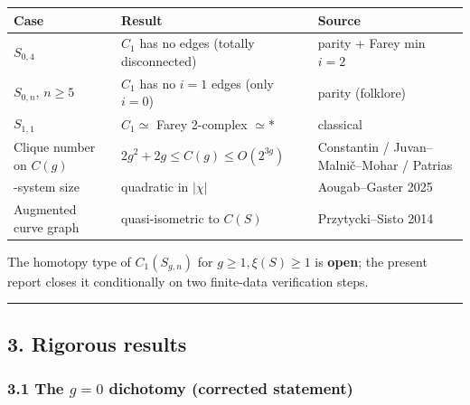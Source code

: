 \documentclass[
]{article}
\newcounter{none} %
\begin{document}
{\def\LTcaptype{none} %
\begin{longtable}[]{@{}
  >{\raggedright\arraybackslash}p{}
  >{\raggedright\arraybackslash}p{}
  >{\raggedright\arraybackslash}p{}@{}}
\toprule\noalign{}
\begin{minipage}[b]{\linewidth}\raggedright
Case
\end{minipage} & \begin{minipage}[b]{\linewidth}\raggedright
Result
\end{minipage} & \begin{minipage}[b]{\linewidth}\raggedright
Source
\end{minipage} \\
\midrule\noalign{}
\endhead
\bottomrule\noalign{}
\endlastfoot
\(S_{0,4}\) & \(C_1\) has no edges (totally disconnected) & parity +
Farey min \(i = 2\) \\
\(S_{0,n}\), \(n \ge 5\) & \(C_1\) has no \(i=1\) edges (only \(i=0\)) &
parity (folklore) \\
\(S_{1,1}\) & \(C_1 \simeq\) Farey 2-complex \(\simeq *\) & classical \\
Clique number on \(C(g)\) & \(2g^2+2g \le C(g) \le O(2^{3g})\) &
Constantin / Juvan--Malnič--Mohar / Patrias \\
1-system size & quadratic in \(|\chi|\) & Aougab--Gaster 2025 \\
Augmented curve graph & quasi-isometric to \(C(S)\) & Przytycki--Sisto
2014 \\
\end{longtable}
}

The homotopy type of \(C_1(S_{g,n})\) for \(g \ge 1, \xi(S) \ge 1\) is
\textbf{open}; the present report closes it conditionally on two
finite-data verification steps.

\begin{center}\rule{0.5\linewidth}{0.5pt}\end{center}

\subsection{3. Rigorous results}\label{rigorous-results}

\subsubsection{\texorpdfstring{3.1 The \(g=0\) dichotomy (corrected
statement)}{3.1 The g=0 dichotomy (corrected statement)}}\label{the-g0-dichotomy-corrected-statement}
\end{document}
